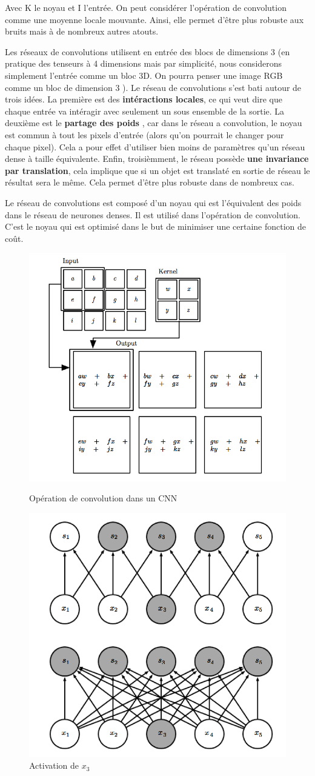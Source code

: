 Avec K le noyau et I l'entrée. On peut considérer l'opération de convolution comme une moyenne locale mouvante. Ainsi, elle permet d'être plus robuste aux bruits mais à de nombreux autres atouts.


Les réseaux de convolutions utilisent en entrée des blocs de dimensions 3 (en pratique des tenseurs à 4 dimensions mais par simplicité, nous considerons simplement l'entrée comme un bloc 3D. On pourra penser une image RGB comme un bloc de dimension 3 ). Le réseau de convolutions s'est bati autour de trois idées. La première est des \textbf{intéractions locales}, ce qui veut dire que chaque entrée va intéragir avec seulement un sous ensemble de la sortie. La deuxième est le \textbf{partage des poids }, car dans le réseau a convolution, le noyau est commun à tout les pixels d'entrée (alors qu'on pourrait le changer pour chaque pixel). Cela a pour effet d'utiliser bien moins de paramètres qu'un réseau dense à taille équivalente. Enfin, troisièmment, le réseau possède \textbf{une invariance par translation}, cela implique que si un objet est translaté en sortie de réseau le résultat sera le même. Cela permet d'être plus robuste dans de nombreux cas.

Le réseau de convolutions est composé d'un noyau qui est l'équivalent des poids dans le réseau de neurones denses. Il est utilisé dans l'opération de convolution. C'est le noyau qui est optimisé dans le but de minimiser une certaine fonction de coût.

\begin{figure}[h!]
\centering
\begin{minipage}{.5\textwidth}
  \centering
  \includegraphics[width=.4\linewidth]{./assets/DeepLearning/conv.png}
  \caption{Opération de convolution dans un CNN}
\end{minipage}%
\begin{minipage}{.5\textwidth}
  \centering
  \includegraphics[width=.4\linewidth]{./assets/DeepLearning/convVSdense.png}
  \caption{Activation de  $x_3$} 
\end{minipage}
\end{figure}

